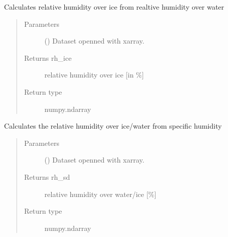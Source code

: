 \documentclass[a4paper,11pt,english]{sphinxmanual}
\begin{document}
\begin{fulllineitems}
\label{\detokenize{modules:envlib.calc_altrv_vars.get_rh_ice}}
Calculates relative humidity over ice from realtive humidity over water
\begin{quote}\begin{description}
\item[{Parameters}] \leavevmode
{} () \textendash{} Dataset openned with xarray.

\item[{Returns rh\_ice}] \leavevmode
relative humidity over ice {[}in \%{]}

\item[{Return type}] \leavevmode
numpy.ndarray

\end{description}\end{quote}

\end{fulllineitems}


\begin{fulllineitems}
\label{\detokenize{modules:envlib.calc_altrv_vars.get_rh_sd}}
Calculates the relative humidity over ice/water from specific humidity
\begin{quote}\begin{description}
\item[{Parameters}] \leavevmode
{} () \textendash{} Dataset openned with xarray.

\item[{Returns rh\_sd}] \leavevmode
relative humidity over water/ice {[}\%{]}

\item[{Return type}] \leavevmode
numpy.ndarray

\end{description}\end{quote}

\end{fulllineitems}
\end{document}
